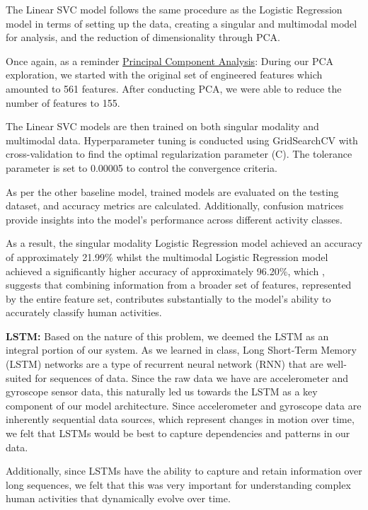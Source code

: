 \documentclass[conference]{IEEEtran}
\begin{document}
The Linear SVC model follows the same procedure as the Logistic Regression model in terms of setting up the data, creating a singular and multimodal model for analysis, and the reduction of dimensionality through PCA.

Once again, as a reminder \newline 
\underline{Principal Component Analysis}: During our PCA exploration, we started with the original set of engineered features which amounted to 561 features. After conducting PCA, we were able to reduce the number of features to 155. 


The Linear SVC models are then trained on both singular modality and multimodal data. Hyperparameter tuning is conducted using GridSearchCV with cross-validation to find the optimal regularization parameter (C). The tolerance parameter is set to 0.00005 to control the convergence criteria.

As per the other baseline model, trained models are evaluated on the testing dataset, and accuracy metrics are calculated. Additionally, confusion matrices provide insights into the model's performance across different activity classes.

As a result, the singular modality Logistic Regression model achieved an accuracy of approximately 21.99\% whilst the multimodal Logistic Regression model achieved a significantly higher accuracy of approximately 96.20\%, which , suggests that combining information from a broader set of features, represented by the entire feature set, contributes substantially to the model's ability to accurately classify human activities. \newline 

\textbf{LSTM:} Based on the nature of this problem, we deemed the LSTM as an integral portion of our system. As we learned in class, Long Short-Term Memory (LSTM) networks are a type of recurrent neural network (RNN) that are well-suited for sequences of data. Since the raw data we have are accelerometer and gyroscope sensor data, this naturally led us towards the LSTM as a key component of our model architecture. Since accelerometer and gyroscope data are inherently sequential data sources, which represent changes in motion over time, we felt that LSTMs would be best to capture dependencies and patterns in our data. 

Additionally, since LSTMs have the ability to capture and retain information over long sequences, we felt that this was very important for understanding complex human activities that dynamically evolve over time.
\end{document}
